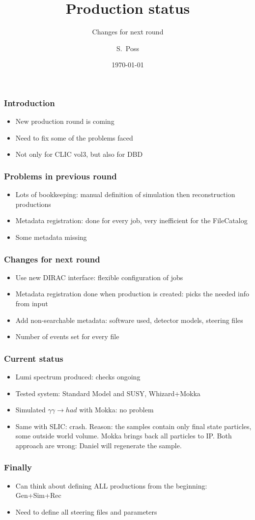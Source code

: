 \documentclass{beamer}
\title{Production status}
\subtitle{Changes for next round}
\author{S.~Poss}
\institute[CERN]
{%
CERN, Switzerland
}
\date{\today}
\begin{document}
\begin{frame}
\titlepage
\end{frame}

\begin{frame}
\frametitle{Introduction}
\begin{itemize}
  \item New production round is coming
  \item Need to fix some of the problems faced
  \item Not only for CLIC vol3, but also for DBD
\end{itemize}
\end{frame}

\begin{frame}
\frametitle{Problems in previous round}
\begin{itemize}
  \item Lots of bookkeeping: manual definition of simulation then reconstruction
  productions
  \item Metadata registration: done for every job, very inefficient for the
  FileCatalog
  \item Some metadata missing
\end{itemize}
\end{frame}

\begin{frame}
\frametitle{Changes for next round}
\begin{itemize}
  \item Use new DIRAC interface: flexible configuration of jobs
  \item Metadata registration done when production is created: picks the needed
  info from input
  \item Add non-searchable metadata: software used, detector models, steering
  files
  \item Number of events set for every file
\end{itemize}
\end{frame}

\begin{frame}
\frametitle{Current status}
\begin{itemize}
  \item Lumi spectrum produced: checks ongoing
  \item Tested system: Standard Model and SUSY, Whizard+Mokka
  \item Simulated $\gamma\gamma \to had$ with Mokka: no problem
  \item Same with SLIC: crash. Reason: the samples contain only final state
  particles, some outside world volume. Mokka brings back all particles to IP.
  Both approach are wrong: Daniel will regenerate the sample. 
\end{itemize}
\end{frame}
\begin{frame}
\frametitle{Finally}
\begin{itemize}
  \item Can think about defining ALL productions from the beginning: Gen+Sim+Rec
  \item Need to define all steering files and parameters
\end{itemize}
\end{frame}
\end{document}
